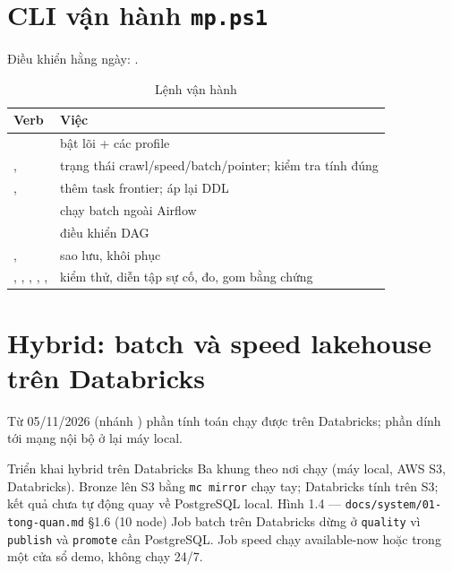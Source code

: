 \section{CLI vận hành \texttt{mp.ps1}}
Điều khiển hằng ngày: .
\begin{xltabular}{\linewidth}{@{}L{62mm}Y@{}}
  \caption{Lệnh vận hành}\label{tab:mp-verbs}\\
  \toprule
  \textbf{Verb} & \textbf{Việc} \\
  \midrule
   & bật lõi + các profile \\
  ,  & trạng thái crawl/speed/batch/pointer; kiểm tra tính đúng \\
  ,  & thêm task frontier; áp lại DDL \\
   & chạy batch  ngoài Airflow \\
   & điều khiển DAG \\
  ,  & sao lưu, khôi phục \\
  , , , , ,  & kiểm thử, diễn tập sự cố, đo, gom bằng chứng \\
  \bottomrule
\end{xltabular}

\section{Hybrid: batch và speed lakehouse trên Databricks}
Từ 05/11/2026 (nhánh ) phần tính toán chạy được trên Databricks; phần dính tới mạng nội bộ ở lại máy local.

  {Triển khai hybrid trên Databricks}
  {Ba khung theo nơi chạy (máy local, AWS S3, Databricks). Bronze lên S3 bằng \texttt{mc mirror} chạy tay; Databricks tính trên S3; kết quả chưa tự động quay về PostgreSQL local.}
  {Hình 1.4 — \texttt{docs/system/01-tong-quan.md} §1.6 (10 node)}
  {Job batch trên Databricks dừng ở \texttt{quality} vì \texttt{publish} và \texttt{promote} cần PostgreSQL. Job speed chạy available-now hoặc trong một cửa sổ demo, không chạy 24/7.}


